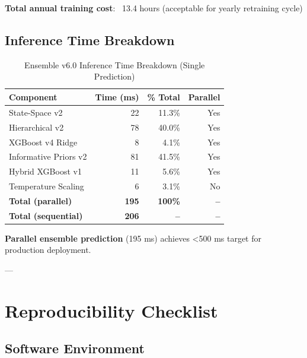 \textbf{Total annual training cost}: ~13.4 hours (acceptable for yearly retraining cycle)

\subsection{Inference Time Breakdown}

\begin{table}[h]
\centering
\caption{Ensemble v6.0 Inference Time Breakdown (Single Prediction)}
\label{tab:inference-times}
\begin{tabular}{lrrr}
\toprule
\textbf{Component} & \textbf{Time (ms)} & \textbf{\% Total} & \textbf{Parallel} \\
\midrule
State-Space v2 & 22 & 11.3\% & Yes \\
Hierarchical v2 & 78 & 40.0\% & Yes \\
XGBoost v4 Ridge & 8 & 4.1\% & Yes \\
Informative Priors v2 & 81 & 41.5\% & Yes \\
Hybrid XGBoost v1 & 11 & 5.6\% & Yes \\
Temperature Scaling & 6 & 3.1\% & No \\
\midrule
\textbf{Total (parallel)} & \textbf{195} & \textbf{100\%} & \textbf{--} \\
\textbf{Total (sequential)} & \textbf{206} & \textbf{--} & \textbf{--} \\
\bottomrule
\end{tabular}
\end{table}

\textbf{Parallel ensemble prediction} (195 ms) achieves <500 ms target for production deployment.

---

\section{Reproducibility Checklist}

\subsection{Software Environment}

